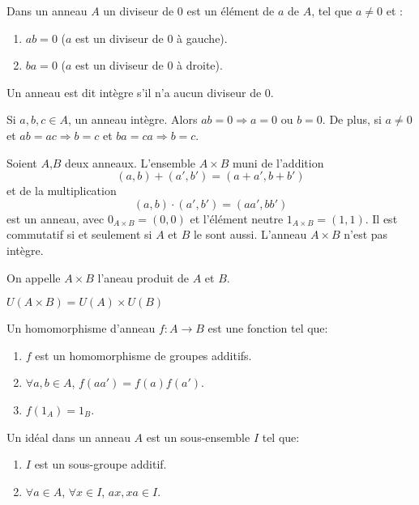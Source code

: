 \documentclass[12pt,a4paper]{article}
\begin{document}
\begin{flushleft}
\begin{mydef}
Dans un anneau $A$ un diviseur de $0$ est un élément de $a$ de $A$, tel que $a \neq 0$ et :
\begin{enumerate}
\item $ab = 0$ ($a$ est un diviseur de $0$ à gauche).
\item $ba = 0$ ($a$ est un diviseur de $0$ à droite).
\end{enumerate}
\end{mydef}

\begin{mydef}
Un anneau est dit intègre s'il n'a aucun diviseur de $0$.
\end{mydef}

\begin{prop}
Si $a,b,c \in A$, un anneau intègre. Alors $ab = 0 \Rightarrow a=0$ ou $b=0$. De plus, si $a \neq 0$ et $ab = ac \Rightarrow b=c$ et $ba = ca \Rightarrow b = c.$
\end{prop}

\begin{prop}
Soient $A$,$B$ deux anneaux. L'ensemble $A \times B$ muni de l'addition $$ (a,b) + (a',b') = (a+a',b+b')$$ et de la multiplication $$(a,b) \cdot (a',b') = (aa',bb')$$ est un anneau, avec $0_{A \times B} = (0,0)$ et l'élément neutre $1_{A \times B} = (1,1)$. Il est commutatif si et seulement si $A$ et $B$ le sont aussi. L'anneau $A \times B$ n'est pas intègre.
\end{prop}

\begin{mydef}
On appelle $A \times B$ l'aneau produit de $A$ et $B$.
\end{mydef}

\begin{prop} 
$U(A \times B) = U(A) \times U(B) $
\end{prop}

\begin{mydef}
Un homomorphisme d'anneau $f:A\longrightarrow B$ est une fonction tel que:
\begin{enumerate}
\item $f$ est un homomorphisme de groupes additifs.
\item $\forall a,b \in A$, $f(aa')=f(a)f(a')$.
\item $f(1_A) = 1_B$.
\end{enumerate}
\end{mydef}

\begin{mydef}
Un idéal dans un anneau $A$ est un sous-ensemble $I$ tel que:
\begin{enumerate}
\item $I$ est un sous-groupe additif.
\item $\forall a \in A$, $\forall x \in I$, $ax, xa \in I$.
\end{enumerate}
\end{mydef}


\end{flushleft}
\end{document}

